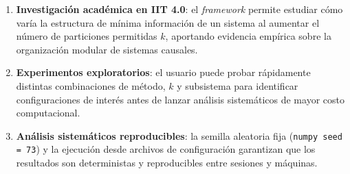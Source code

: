 \begin{enumerate}
  \item \textbf{Investigación académica en IIT 4.0}: el \textit{framework} permite estudiar
        cómo varía la estructura de mínima información de un sistema al aumentar el número de
        particiones permitidas $k$, aportando evidencia empírica sobre la organización modular
        de sistemas causales.

  \item \textbf{Experimentos exploratorios}: el usuario puede probar rápidamente distintas
        combinaciones de método, $k$ y subsistema para identificar configuraciones de interés
        antes de lanzar análisis sistemáticos de mayor costo computacional.

  \item \textbf{Análisis sistemáticos reproducibles}: la semilla aleatoria fija
        (\texttt{numpy seed = 73}) y la ejecución desde archivos de configuración garantizan
        que los resultados son deterministas y reproducibles entre sesiones y máquinas.
\end{enumerate}
